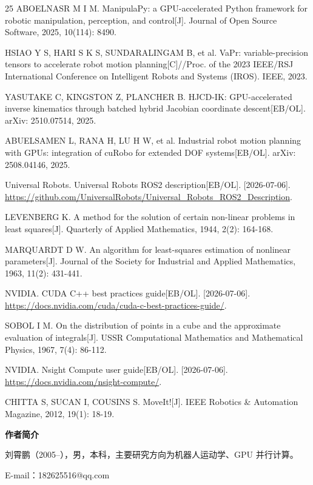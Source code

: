 \documentclass[twocolumn,a4paper,10pt]{ctexart}
\begin{document}
\begin{thebibliography}{25}
ABOELNASR M I M. ManipulaPy: a GPU-accelerated Python framework for robotic manipulation, perception, and control[J]. Journal of Open Source Software, 2025, 10(114): 8490.

HSIAO Y S, HARI S K S, SUNDARALINGAM B, et al. VaPr: variable-precision tensors to accelerate robot motion planning[C]//Proc. of the 2023 IEEE/RSJ International Conference on Intelligent Robots and Systems (IROS). IEEE, 2023.

YASUTAKE C, KINGSTON Z, PLANCHER B. HJCD-IK: GPU-accelerated inverse kinematics through batched hybrid Jacobian coordinate descent[EB/OL]. arXiv: 2510.07514, 2025.

ABUELSAMEN L, RANA H, LU H W, et al. Industrial robot motion planning with GPUs: integration of cuRobo for extended DOF systems[EB/OL]. arXiv: 2508.04146, 2025.

Universal Robots. Universal Robots ROS2 description[EB/OL]. [2026-07-06]. \url{https://github.com/UniversalRobots/Universal_Robots_ROS2_Description}.

LEVENBERG K. A method for the solution of certain non-linear problems in least squares[J]. Quarterly of Applied Mathematics, 1944, 2(2): 164-168.

MARQUARDT D W. An algorithm for least-squares estimation of nonlinear parameters[J]. Journal of the Society for Industrial and Applied Mathematics, 1963, 11(2): 431-441.

NVIDIA. CUDA C++ best practices guide[EB/OL]. [2026-07-06]. \url{https://docs.nvidia.com/cuda/cuda-c-best-practices-guide/}.

SOBOL I M. On the distribution of points in a cube and the approximate evaluation of integrals[J]. USSR Computational Mathematics and Mathematical Physics, 1967, 7(4): 86-112.

NVIDIA. Nsight Compute user guide[EB/OL]. [2026-07-06]. \url{https://docs.nvidia.com/nsight-compute/}.

CHITTA S, SUCAN I, COUSINS S. MoveIt![J]. IEEE Robotics \& Automation Magazine, 2012, 19(1): 18-19.

\end{thebibliography}

\vspace{4mm}
{\bfseries 作者简介}

\vspace{2mm}
{\small 刘霄鹏（2005--），男，本科，主要研究方向为机器人运动学、GPU 并行计算。}\par
{\small E-mail：182625516@qq.com}\par
\end{document}

